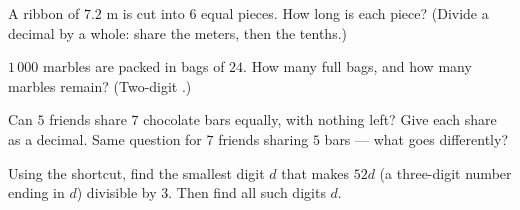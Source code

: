\begin{exercise}[$\star$]\label{exo:g5:division:8}
A ribbon of $7.2$ m is cut into $6$ equal pieces. How long is each
piece? (Divide a decimal by a whole: share the meters, then the
tenths.)
\end{exercise}

\begin{exercise}[$\star$]\label{exo:g5:division:9}
$1\,000$ marbles are packed in bags of $24$. How many full bags, and
how many marbles remain? (Two-digit .)
\end{exercise}

\begin{exercise}[$\star\star$]\label{exo:g5:division:10}
Can $5$ friends share $7$ chocolate bars equally, with nothing left?
Give each share as a decimal. Same question for $7$ friends sharing
$5$ bars --- what goes differently?
\end{exercise}

\begin{exercise}[$\star\star$]\label{exo:g5:division:11}
Using the  shortcut, find the smallest digit $d$ that makes
$52d$ (a three-digit number ending in $d$) divisible by $3$. Then
find all such digits $d$.
\end{exercise}

